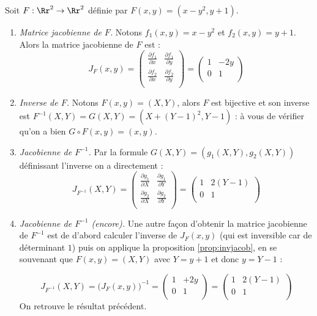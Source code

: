 \documentclass[11pt, class=report,crop=false]{standalone}
\begin{document}
\begin{exemple}
Soit $F : \Rr^2 \to \Rr^2$ définie par $F(x,y) = (x-y^2,y+1)$.

\begin{enumerate}
     \item \emph{Matrice jacobienne de $F$.}
Notons $f_1(x,y)=x-y^2$ et $f_2(x,y)=y+1$.
Alors la matrice jacobienne de $F$ est :
$$J_F(x,y) = 
\begin{pmatrix}
\frac{\partial f_1}{\partial x} & \frac{\partial f_1}{\partial y} \\
\frac{\partial f_2}{\partial x} & \frac{\partial f_2}{\partial y} \\
\end{pmatrix}
= 
\begin{pmatrix}
1 & -2y \\
0 & 1 \\
\end{pmatrix}$$

     \item \emph{Inverse de $F$.}
     Notons $F(x,y) = (X,Y)$, alors $F$ est bijective et son inverse est 
     $F^{-1}(X,Y) = G(X,Y) = (X+(Y-1)^2, Y-1)$ : à vous de vérifier qu'on a bien $G \circ F(x,y) = (x,y)$.
     
     \item \emph{Jacobienne de $F^{-1}$.}
     Par la formule $G(X,Y) = (g_1(X,Y),g_2(X,Y))$ définissant l'inverse on a directement :
     $$J_{F^{-1}}(X,Y) = 
     \begin{pmatrix}
     \frac{\partial g_1}{\partial X} & \frac{\partial g_1}{\partial Y} \\
     \frac{\partial g_2}{\partial X} & \frac{\partial g_2}{\partial Y} \\
     \end{pmatrix}
     = 
     \begin{pmatrix}
     1 & 2(Y-1) \\
     0 & 1 \\
     \end{pmatrix}$$
     
     \item \emph{Jacobienne de $F^{-1}$ (encore).}    
     Une autre façon d'obtenir la matrice jacobienne de $F^{-1}$ est de d'abord calculer l'inverse de  $J_F(x,y)$ (qui est inversible car de déterminant $1$) puis on applique la proposition \ref{prop:invjacob}, en se souvenant que $F(x,y) = (X,Y)$
     avec $Y=y+1$ et donc $y=Y-1$ :
     
     $$J_{F^{-1}}(X,Y) = \big(J_F(x,y)\big)^{-1} 
     = \begin{pmatrix}
     1 & +2y \\
     0 & 1 \\
     \end{pmatrix}
     = \begin{pmatrix}
     1 & 2(Y-1) \\
     0 & 1 \\
    \end{pmatrix}     
     $$
     On retrouve le résultat précédent.
     \end{enumerate}    

\end{exemple}
\end{document}

